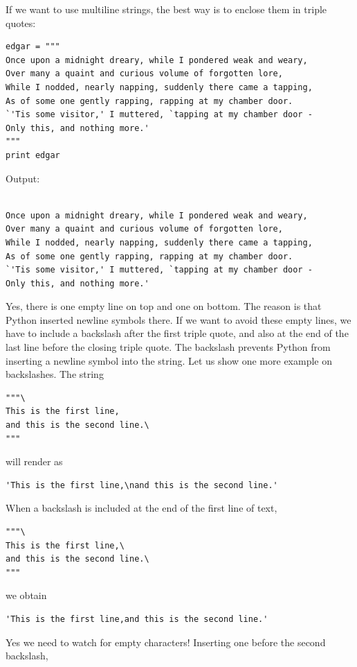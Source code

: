 If we want to use multiline strings, the best way is to enclose them 
in triple quotes: 

\begin{verbatim}
edgar = """
Once upon a midnight dreary, while I pondered weak and weary,
Over many a quaint and curious volume of forgotten lore,
While I nodded, nearly napping, suddenly there came a tapping,
As of some one gently rapping, rapping at my chamber door.
`'Tis some visitor,' I muttered, `tapping at my chamber door -
Only this, and nothing more.'
"""
print edgar
\end{verbatim}
Output:

\begin{verbatim}

Once upon a midnight dreary, while I pondered weak and weary,
Over many a quaint and curious volume of forgotten lore,
While I nodded, nearly napping, suddenly there came a tapping,
As of some one gently rapping, rapping at my chamber door.
`'Tis some visitor,' I muttered, `tapping at my chamber door -
Only this, and nothing more.'

\end{verbatim}
Yes, there is one empty line on top and one on bottom. The reason is that 
Python inserted newline symbols there. If we want to avoid these empty lines, 
we have to include a backslash after the first triple quote, and also at the 
end of the last line before the closing triple quote. The backslash prevents 
Python from inserting a newline symbol into the string. Let us show one more 
example on backslashes. The string 

\begin{verbatim}
"""\
This is the first line,
and this is the second line.\
""" 
\end{verbatim}
will render as

\begin{verbatim}
'This is the first line,\nand this is the second line.' 
\end{verbatim}
When a backslash is included at the end of the first line of text,

\begin{verbatim}
"""\
This is the first line,\
and this is the second line.\
""" 
\end{verbatim}
we obtain 

\begin{verbatim}
'This is the first line,and this is the second line.'
\end{verbatim}
Yes we need to watch for empty characters! Inserting one before the second 
backslash,

